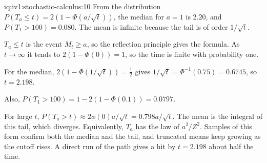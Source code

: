 \begin{solution}{iq:iv1:stochastic-calculus:10}
From the distribution $P(T_a \le t) = 2(1 - \Phi(a/\sqrt{t}))$, the median for $a = 1$ is $2.20$, and $P(T_1 > 100) = 0.080$. The mean is infinite because the tail is of order $1/\sqrt{t}$.

$T_a \le t$ is the event $M_t \ge a$, so the reflection principle gives the formula. As $t \to \infty$ it tends to $2(1 - \Phi(0)) = 1$, so the time is finite with probability one.

For the median, $2(1 - \Phi(1/\sqrt{t})) = \frac12$ gives $1/\sqrt{t} = \Phi^{-1}(0.75) = 0.6745$, so $t = 2.198$.

Also, $P(T_1 > 100) = 1 - 2(1 - \Phi(0.1)) = 0.0797$.

For large $t$, $P(T_a > t) \approx 2\phi(0)a/\sqrt{t} = 0.798a/\sqrt{t}$. The mean is the integral of this tail, which diverges. Equivalently, $T_a$ has the law of $a^2/Z^2$. Samples of this form confirm both the median and the tail, and truncated means keep growing as the cutoff rises. A direct run of the path gives a hit by $t = 2.198$ about half the time.



\end{solution}

